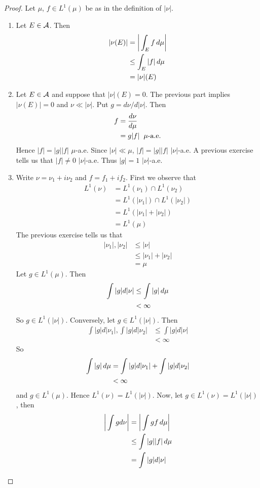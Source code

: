 \documentclass{book}
\begin{document}
	\begin{proof}
		Let $\mu$, $f \in L^1(\mu)$ be as in the definition of $|\nu|$.
		\begin{enumerate}
			\item Let $E \in \mathcal{A}$. Then 
			\begin{align*}
				|\nu(E)| 
				& = \bigg|\int_E f \, d \mu\bigg|\\
				& \leq \int_E |f| \, d \mu\\
				&= |\nu|(E)
			\end{align*}
			\item Let $E \in \mathcal{A}$ and suppose that $|\nu|(E)=0$. The previous part implies $|\nu(E)|=0$ and $\nu \ll |\nu|$. Put $g = d \nu / d|\nu|$. Then 
			\begin{align*}
				f 
				&= \frac{d\nu}{d\mu}\\
				&= g|f| \hspace{2mm }\mu\text{-a.e.}
			\end{align*}
			Hence $|f| = |g||f|$ $\mu$-a.e. Since $|\nu| \ll \mu$, $|f| = |g||f|$ $|\nu|$-a.e. A previous exercise tells us that $|f| \neq 0$ $|\nu|$-a.e. Thus $|g|=1$ $|\nu|$-a.e.\\
			\item Write $\nu = \nu_1 + i\nu_2$ and $f = f_1 + if_2$. First we observe that
			\begin{align*}
				L^1(\nu)
				&= L^1(\nu_1) \cap L^1(\nu_2) \\
				&= L^1(|\nu_1|) \cap L^1(|\nu_2|)\\
				&= L^1(|\nu_1| + |\nu_2|)\\
				&= L^1(\mu)
			\end{align*}
			The previous exercise tells us that 
			\begin{align*}
				|\nu_1|, |\nu_2| 
				&\leq |\nu| \\
				&\leq |\nu_1|+ |\nu_2| \\
				&= \mu
			\end{align*}
			Let $g \in L^1(\mu)$. Then 
			\begin{align*}
				\int |g| d |\nu| 
				&\leq \int |g| \, d \mu \\
				&< \infty
			\end{align*}
			So $g \in L^1(|\nu|)$.
			Conversely, let $g \in L^1(|\nu|)$. Then 
			\begin{align*}
				\int |g| d|\nu_1|, \int |g| d |\nu_2| 
				& \leq \int |g|d |\nu|\\
				& < \infty
			\end{align*}
			So 
			\begin{align*}
				\int |g| \, d \mu
				& =\int |g| d|\nu_1| + \int |g| d |\nu_2| \\
				& < \infty
			\end{align*}
			and $g \in L^1(\mu)$. Hence $L^1(\nu) = L^1(|\nu|)$. 
			Now, let $g \in L^1(\nu) = L^1(|\nu|)$, then 
			\begin{align*}
				\bigg| \int g d\nu \bigg| 
				&= \bigg| \int g f \, d \mu \bigg| \\
				& \leq \int |g||f|\, d \mu\\
				& = \int |g| d |\nu|
			\end{align*}
			

\end{enumerate}
\end{proof}
\end{document}
